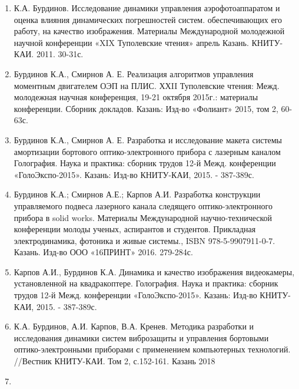 \begin{enumerate}
  \item К.А. Бурдинов. Исследование динамики управления аэрофотоаппаратом и оценка влияния динамических погрешностей систем. обеспечивающих его работу, на качество изображения. Материалы Международной молодежной научной конференции «XIX Туполевские чтения» апрель Казань. КНИТУ- КАИ. 2011. 30-31с.
  \item Бурдинов К.А., Смирнов А. Е. Реализация алгоритмов управления моментным двигателем ОЭП на ПЛИС. ХХII Туполевские чтения: Межд. молодежная научная конференция, 19-21 октября 2015г.: материалы конференции. Сборник докладов. Казань: Изд-во «Фолиант» 2015, том 2, 60-63с.
  \item Бурдинов К.А., Смирнов А. Е. Разработка и исследование макета системы амортизации бортового оптико-электронного прибора с лазерным каналом Голография. Наука и практика: сборник трудов 12-й Межд. конференции «ГолоЭкспо-2015». Казань: Изд-во КНИТУ-КАИ, 2015. - 387-389с.
  \item Бурдинов К.А.; Смирнов А.Е.; Карпов А.И. Разработка конструкции управляемого подвеса лазерного канала следящего оптико-электронного прибора в solid works. Материалы Международной научно-технической конференции молоды ученых, аспирантов и студентов. Прикладная электродинамика, фотоника и живые системы., ISBN 978-5-9907911-0-7. Казань. Изд-во ООО «16ПРИНТ» 2016. 279-284с.
  \item Карпов А.И., Бурдинов К.А. Динамика и качество изображения видеокамеры, установленной на квадракоптере. Голография. Наука и практика: сборник трудов 12-й Межд. конференции «ГолоЭкспо-2015». Казань: Изд-во КНИТУ-КАИ, 2015. - 387-389с.
  \item К.А. Бурдинов, А.И. Карпов, В.А. Кренев. Методика разработки и исследования динамики систем виброзащиты и управления бортовыми оптико-электронными приборами с применением компьютерных технологий. //Вестник КНИТУ-КАИ. Том 2, с.152-161. Казань 2018
  \item 
\end{enumerate}
